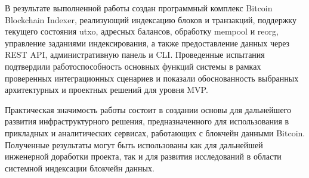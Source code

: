 В результате выполненной работы создан программный комплекс
Bitcoin Blockchain Indexer, реализующий индексацию блоков и
транзакций, поддержку текущего состояния \gls{utxo}, адресных балансов,
обработку mempool и reorg, управление заданиями индексирования, а также предоставление
данных через REST API, административную панель и CLI. Проведенные испытания
подтвердили работоспособность основных функций системы в рамках проверенных
интеграционных сценариев и показали обоснованность выбранных архитектурных и
проектных решений для уровня MVP.

Практическая значимость работы состоит в создании основы для дальнейшего
развития инфраструктурного решения, предназначенного для использования в
прикладных и аналитических сервисах, работающих с блокчейн данными Bitcoin.
Полученные результаты могут быть использованы как для дальнейшей инженерной
доработки проекта, так и для развития исследований в области системной
индексации блокчейн данных.
